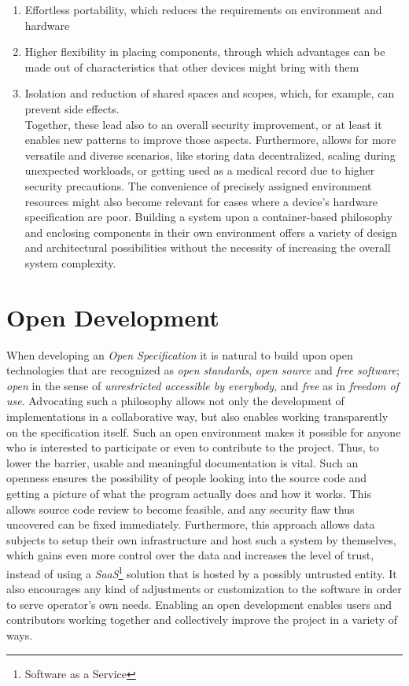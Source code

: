 \documentclass[12pt,english,a4paper,titlepage,cleardoublepage=empty,dottedtoc]{report}
\providecommand{\tightlist}{%
  \setlength{\itemsep}{0pt}\setlength{\parskip}{0pt}}
\begin{document}
\begin{enumerate}
\def\labelenumi{(\Alph{enumi})}
\tightlist
\item
  Effortless portability, which reduces the requirements on environment
  and hardware
\item
  Higher flexibility in placing components, through which advantages can
  be made out of characteristics that other devices might bring with
  them
\item
  Isolation and reduction of shared spaces and scopes, which, for
  example, can prevent side effects.\\
  Together, these lead also to an overall security improvement, or at
  least it enables new patterns to improve those aspects. Furthermore,
  allows for more versatile and diverse scenarios, like storing data
  decentralized, scaling during unexpected workloads, or getting used as
  a medical record due to higher security precautions. The convenience
  of precisely assigned environment resources might also become relevant
  for cases where a device's hardware specification are poor. Building a
  system upon a container-based philosophy and enclosing components in
  their own environment offers a variety of design and architectural
  possibilities without the necessity of increasing the overall system
  complexity.
\end{enumerate}

\section{Open Development}\label{open-development}

When developing an \emph{Open Specification} it is natural to build upon
open technologies that are recognized as \emph{open standards},
\emph{open source} and \emph{free software}; \emph{open} in the sense of
\emph{unrestricted accessible by everybody}, and \emph{free} as in
\emph{freedom of use}. Advocating such a philosophy allows not only the
development of implementations in a collaborative way, but also enables
working transparently on the specification itself. Such an open
environment makes it possible for anyone who is interested to
participate or even to contribute to the project. Thus, to lower the
barrier, usable and meaningful documentation is vital. Such an openness
ensures the possibility of people looking into the source code and
getting a picture of what the program actually does and how it works.
This allows source code review to become feasible, and any security flaw
thus uncovered can be fixed immediately. Furthermore, this approach
allows data subjects to setup their own infrastructure and host such a
system by themselves, which gains even more control over the data and
increases the level of trust, instead of using a \emph{SaaS}\footnote{Software
  as a Service} solution that is hosted by a possibly untrusted entity.
It also encourages any kind of adjustments or customization to the
software in order to serve operator's own needs. Enabling an open
development enables users and contributors working together and
collectively improve the project in a variety of ways.
\end{document}

